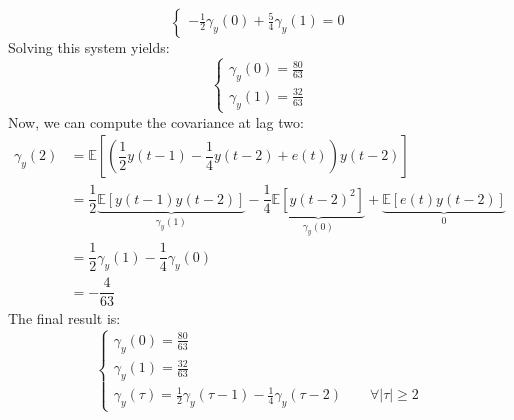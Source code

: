 \begin{enumerate}
\[\begin{cases}
            -\frac{1}{2}\gamma_y(0)+\frac{5}{4}\gamma_y(1)=0
        \end{cases}\]
        Solving this system yields:
        \[\begin{cases}
            \gamma_y(0)=\frac{80}{63} \\ 
            \gamma_y(1)=\frac{32}{63}
        \end{cases}\]
        Now, we can compute the covariance at lag two:
        \begin{align*}
            \gamma_y(2)     &= \mathbb{E}\left[\left(\dfrac{1}{2}y(t-1)-\dfrac{1}{4}y(t-2)+e(t)\right)y(t-2)\right] \\
                            &= \dfrac{1}{2}\underbrace{\mathbb{E}\left[y(t-1)y(t-2)\right]}_{\gamma_y(1)} -\dfrac{1}{4}\underbrace{\mathbb{E}\left[{y(t-2)}^2\right]}_{\gamma_y(0)} +\underbrace{\mathbb{E}\left[e(t)y(t-2)\right]}_0  \\
                            &= \dfrac{1}{2}\gamma_y(1) -\dfrac{1}{4}\gamma_y(0) \\
                            &= -\dfrac{4}{63}
        \end{align*}
        The final result is:
        \[\begin{cases}
            \gamma_y(0)=\frac{80}{63} \\
            \gamma_y(1)=\frac{32}{63} \\
            \gamma_y(\tau)=\frac{1}{2}\gamma_y(\tau-1)-\frac{1}{4}\gamma_y(\tau-2) \qquad \forall\left\lvert \tau\right\rvert \geq 2
        \end{cases}\]
\end{enumerate}